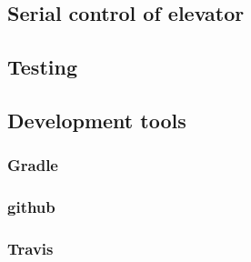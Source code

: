 \documentclass[a4paper, 12pt]{article}
\begin{document}
\subsection{Serial control of elevator}
\subsection{Testing}
\subsection{Development tools}

\subsubsection{Gradle}

\subsubsection{github}

\subsubsection{Travis}



\end{document}
